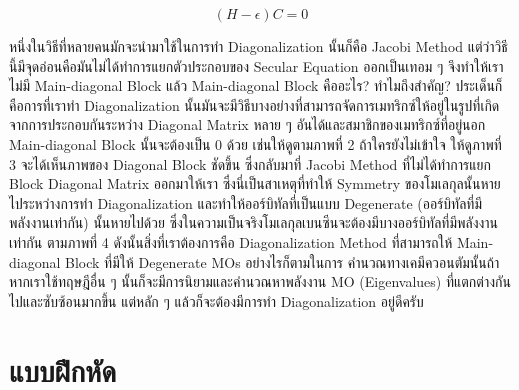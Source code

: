 \begin{equation}
    (H - \epsilon)C = 0
\end{equation}

หนึ่งในวิธีที่หลายคนมักจะนำมาใช้ในการทำ Diagonalization นั้นก็คือ Jacobi Method แต่ว่าวิธีนี้มีจุดอ่อนคือมันไม่ได้ทำการแยกตัวประกอบของ 
Secular Equation ออกเป็นเทอม ๆ จึงทำให้เราไม่มี Main-diagonal Block แล้ว Main-diagonal Block คืออะไร? ทำไมถึงสำคัญ?
ประเด็นก็คือการที่เราทำ Diagonalization นั้นมันจะมีวิธีบางอย่างที่สามารถจัดการเมทริกซ์ให้อยู่ในรูปที่เกิดจากการประกอบกันระหว่าง Diagonal 
Matrix หลาย ๆ อันได้และสมาชิกของเมทริกซ์ที่อยู่นอก Main-diagonal Block นั้นจะต้องเป็น 0 ด้วย เช่นให้ดูตามภาพที่ 2 ถ้าใครยังไม่เข้าใจ%
ให้ดูภาพที่ 3 จะได้เห็นภาพของ Diagonal Block ชัดขึ้น ซึ่งกลับมาที่ Jacobi Method ที่ไม่ได้ทำการแยก Block Diagonal Matrix 
ออกมาให้เรา ซึ่งนี่เป็นสาเหตุที่ทำให้ Symmetry ของโมเลกุลนั้นหายไประหว่างการทำ Diagonalization และทำให้ออร์บิทัลที่เป็นแบบ Degenerate 
(ออร์บิทัลที่มีพลังงานเท่ากัน) นั้นหายไปด้วย ซึ่งในความเป็นจริงโมเลกุลเบนซีนจะต้องมีบางออร์บิทัลที่มีพลังงานเท่ากัน ตามภาพที่ 4 
ดังนั้นสิ่งที่เราต้องการคือ Diagonalization Method ที่สามารถให้ Main-diagonal Block ที่มีให้ Degenerate MOs อย่างไรก็ตามในการ%
คำนวณทางเคมีควอนตัมนั้นถ้าหากเราใช้ทฤษฎีอื่น ๆ นั้นก็จะมีการนิยามและคำนวณหาพลังงาน MO (Eigenvalues) ที่แตกต่างกันไปและซับซ้อนมากขึ้น 
แต่หลัก ๆ แล้วก็จะต้องมีการทำ Diagonalization อยู่ดีครับ

\section{แบบฝึกหัด}
